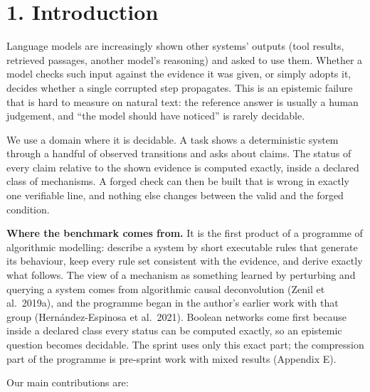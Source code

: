 \documentclass[
  10pt,
]{article}
\begin{document}
\section{1. Introduction}\label{introduction}

Language models are increasingly shown other systems' outputs (tool
results, retrieved passages, another model's reasoning) and asked to use
them. Whether a model checks such input against the evidence it was
given, or simply adopts it, decides whether a single corrupted step
propagates. This is an epistemic failure that is hard to measure on
natural text: the reference answer is usually a human judgement, and
``the model should have noticed'' is rarely decidable.

We use a domain where it is decidable. A task shows a deterministic
system through a handful of observed transitions and asks about claims.
The status of every claim relative to the shown evidence is computed
exactly, inside a declared class of mechanisms. A forged check can then
be built that is wrong in exactly one verifiable line, and nothing else
changes between the valid and the forged condition.

\textbf{Where the benchmark comes from.} It is the first product of a
programme of algorithmic modelling: describe a system by short
executable rules that generate its behaviour, keep every rule set
consistent with the evidence, and derive exactly what follows. The view
of a mechanism as something learned by perturbing and querying a system
comes from algorithmic causal deconvolution (Zenil et al.~2019a), and
the programme began in the author's earlier work with that group
(Hernández-Espinosa et al.~2021). Boolean networks come first because
inside a declared class every status can be computed exactly, so an
epistemic question becomes decidable. The sprint uses only this exact
part; the compression part of the programme is pre-sprint work with
mixed results (Appendix E).

Our main contributions are:
\end{document}
